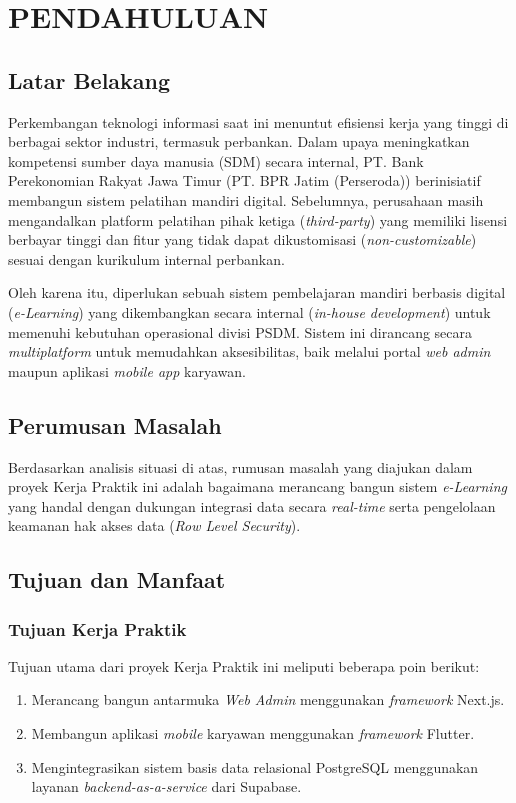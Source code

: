 \chapter{PENDAHULUAN}

\section{Latar Belakang}

Perkembangan teknologi informasi saat ini menuntut efisiensi kerja yang tinggi di berbagai sektor industri, termasuk perbankan. Dalam upaya meningkatkan kompetensi sumber daya manusia (SDM) secara internal, PT. Bank Perekonomian Rakyat Jawa Timur (PT. BPR Jatim (Perseroda)) berinisiatif membangun sistem pelatihan mandiri digital. Sebelumnya, perusahaan masih mengandalkan platform pelatihan pihak ketiga (\textit{third-party}) yang memiliki lisensi berbayar tinggi dan fitur yang tidak dapat dikustomisasi (\textit{non-customizable}) sesuai dengan kurikulum internal perbankan.

Oleh karena itu, diperlukan sebuah sistem pembelajaran mandiri berbasis digital (\textit{e-Learning}) yang dikembangkan secara internal (\textit{in-house development}) untuk memenuhi kebutuhan operasional divisi PSDM. Sistem ini dirancang secara \textit{multiplatform} untuk memudahkan aksesibilitas, baik melalui portal \textit{web admin} maupun aplikasi \textit{mobile app} karyawan.

\section{Perumusan Masalah}

Berdasarkan analisis situasi di atas, rumusan masalah yang diajukan dalam proyek Kerja Praktik ini adalah bagaimana merancang bangun sistem \textit{e-Learning} yang handal dengan dukungan integrasi data secara \textit{real-time} serta pengelolaan keamanan hak akses data (\textit{Row Level Security}).

\section{Tujuan dan Manfaat}

\subsection{Tujuan Kerja Praktik}

Tujuan utama dari proyek Kerja Praktik ini meliputi beberapa poin berikut:
\begin{enumerate}[label=\arabic*)]
    \item Merancang bangun antarmuka \textit{Web Admin} menggunakan \textit{framework} Next.js.
    \item Membangun aplikasi \textit{mobile} karyawan menggunakan \textit{framework} Flutter.
    \item Mengintegrasikan sistem basis data relasional PostgreSQL menggunakan layanan \textit{backend-as-a-service} dari Supabase.
\end{enumerate}

